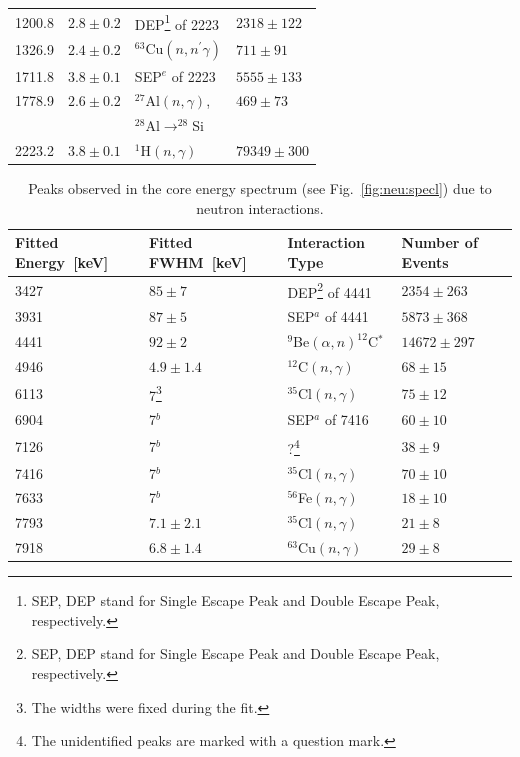 \begin{table}[tbhp]
\begin{minipage}{\linewidth}
\begin{tabular}{llll}
      1200.8 & $2.8 \pm 0.2$ & DEP\footnote{SEP, DEP stand for Single
        Escape Peak and Double Escape Peak, respectively.} of 2223
      & $2318 \pm 122$ \\
      1326.9 & $2.4 \pm 0.2$ & $^{63}$Cu$(n,n^\prime\gamma)$   & $711 
\pm 91$  \\
      1711.8 & $3.8 \pm 0.1$ & SEP$^e$ of 2223 & $5555 \pm 133$ \\
      1778.9 & $2.6 \pm 0.2$ & $^{27}$Al$(n,\gamma)$, & $469  \pm 73$
\\
      &  & $^{28}$Al$\rightarrow^{28}$Si &  \\
      2223.2 & $3.8 \pm 0.1$ & $^{1}$H$(n,\gamma)$ & $79349 \pm 300$\\
    \end{tabular}
  \end{minipage}
\end{table}

\begin{table}[tbhp]
  \caption{Peaks observed in the core energy spectrum (see
Fig.~\ref{fig:neu:specl})
    due to neutron interactions.} 
  \label{tab:neu:peak2}\centering
  \begin{minipage}{\linewidth}\centering
    \begin{tabular}{llll} \hline\noalign{\smallskip}
      Fitted Energy~[keV]& Fitted FWHM~[keV]& Interaction Type& Number of Events\\\hline
 3427 & $85 \pm 7$
      & DEP\footnote{SEP, DEP stand for Single Escape Peak and Double
        Escape Peak, respectively.} of 4441 & $2354 \pm 263$ \\
      3931 & $87 \pm 5$  & SEP$^a$ of 4441 & $5873 \pm 368$ \\
      4441 & $92 \pm 2$  & $^{9}$Be$(\alpha,n)^{12}$C$^{*}$ & $14672
\pm 297$ \\
      4946 & $4.9\pm1.4$ & $^{12}$C$(n,\gamma)$            & $68 \pm
15$     \\
      6113 & 7\footnote{The widths were fixed during the fit.}
      & $^{35}$Cl$(n,\gamma)$ & $75 \pm 12$ \\
      6904 & 7$^b$      & SEP$^a$ of 7416            & $60 \pm 10$ \\
      7126 & 7$^b$ & ?\footnote{The unidentified peaks are marked with
        a question mark.} & $38 \pm  9$ \\
      7416 & 7$^b$       & $^{35}$Cl$(n,\gamma)$ & $70 \pm 10$ \\
      7633 & 7$^b$       & $^{56}$Fe$(n,\gamma)$ & $18 \pm 10$ \\
      7793 & $7.1\pm2.1$ & $^{35}$Cl$(n,\gamma)$ & $21 \pm  8$ \\
      7918 & $6.8\pm1.4$ & $^{63}$Cu$(n,\gamma)$ & $29 \pm  8$ \\
  \end{tabular}
  \end{minipage}
\end{table}

